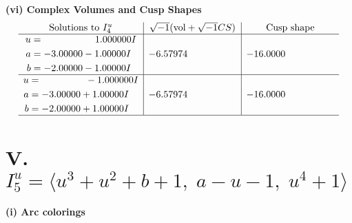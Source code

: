 \documentclass[1p]{elsarticle_modified}
\theoremstyle{definition}
\newcommand{\I}{\sqrt{-1}}
\begin{document}
\newpage\flushleft \textbf{(vi) Complex Volumes and Cusp Shapes}
$$\begin{array}{c|c|c}  
\text{Solutions to }I^u_{4}& \I (\text{vol} + \sqrt{-1}CS) & \text{Cusp shape}\\
 \hline 
\begin{aligned}
u &= \phantom{-0.000000 -}1.000000 I \\
a &= -3.00000 - 1.00000 I \\
b &= -2.00000 - 1.00000 I\end{aligned}
 & -6.57974\phantom{ +0.000000I} & -16.0000\phantom{ +0.000000I} \\ \hline\begin{aligned}
u &= \phantom{-0.000000 } -1.000000 I \\
a &= -3.00000 + 1.00000 I \\
b &= -2.00000 + 1.00000 I\end{aligned}
 & -6.57974\phantom{ +0.000000I} & -16.0000\phantom{ +0.000000I}\\
 \hline 
 \end{array}$$\newpage\newpage\renewcommand{\arraystretch}{1}
\centering \section*{V. $I^u_{5}= \langle u^3+u^2+b+1,\;a- u-1,\;u^4+1 \rangle$}
\flushleft \textbf{(i) Arc colorings}\\
\end{document}
